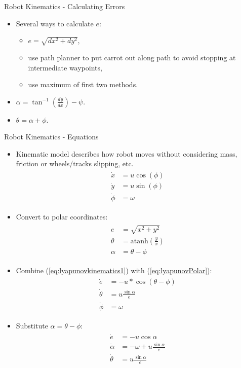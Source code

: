 \documentclass[hyperref={pdfpagelabels=false}]{beamer}
\begin{document}
\begin{frame}{Robot Kinematics - Calculating Errors}
\begin{itemize}
\item Several ways to calculate $e$:
\begin{itemize}
\item $e=\sqrt{dx^2+dy^2}$,
\item use path planner to put carrot out along path to avoid stopping at intermediate waypoints,
\item use maximum of first two methods.
\end{itemize}
\item $\alpha=\tan^{-1}\left(\tfrac{dy}{dx}\right) - \psi$.
\item $\theta=\alpha+\phi$.
\end{itemize}
\end{frame}

\begin{frame}[allowframebreaks]{Robot Kinematics - Equations}
\begin{itemize}
\item Kinematic model describes how robot moves without considering mass, friction or wheels/tracks slipping, etc.
\begin{align}
\label{eq:lyapunovkinematics1}
\begin{split}
\dot{x} &= u\cos(\phi) \\
\dot{y} &= u\sin(\phi) \\
\dot{\phi} &= \omega
\end{split}
\end{align}
\item Convert to polar coordinates:
\begin{align}
\label{eq:lyapunovPolar}
\begin{split}
e &= \sqrt{x^2+y^2} \\
\theta &= \text{atanh}(\tfrac{y}{x}) \\
\alpha &= \theta - \phi
\end{split}
\end{align}
\item Combine (\ref{eq:lyapunovkinematics1}) with (\ref{eq:lyapunovPolar}):
\begin{align*}
\begin{split}
\dot{e} &= -u*\cos(\theta-\phi) \\
\dot{\theta} &= u\frac{\sin\alpha}{e} \\
\dot{\phi} &= \omega
\end{split}
\end{align*}
\item Substitute $\alpha=\theta-\phi$:
\begin{align}
\label{eq:lyapunovkinematics}
\begin{split}
\dot{e} &= -u\cos\alpha \\
\dot{\alpha} &= -\omega + u\frac{\sin\alpha}{e} \\
\dot{\theta} &= u\frac{\sin\alpha}{e}
\end{split}
\end{align}
\end{itemize}
\end{frame}
\end{document}
